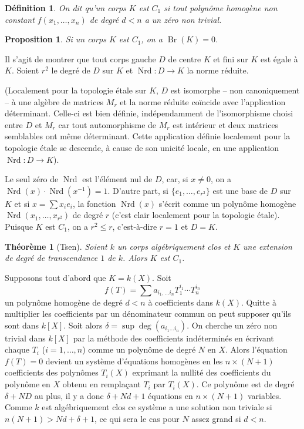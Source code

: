 \documentclass{book}
\DeclareMathOperator{\br}{Br}
\DeclareMathOperator{\nrd}{Nrd}
\newtheorem{proposition}[subsubsection]{Proposition}
\newtheorem{definition}[subsubsection]{Définition}
\newtheorem{theorem}[subsubsection]{Théorème}
\begin{document}
\begin{definition}\label{I:3-2-1}
On dit qu'un corps $K$ est $C_1$ si tout polynôme homogène non constant 
$f(x_1,\dotsc,x_n)$ de degré $d<n$ a un zéro non trivial.
\end{definition}





\begin{proposition}\label{I:3-2-2}
Si un corps $K$ est $C_1$, on a $\br(K)=0$.
\end{proposition}

Il s'agit de montrer que tout corps gauche $D$ de centre $K$ et fini sur $K$ 
est égale à $K$. Soient $r^2$ le degré de $D$ sur $K$ et $\nrd:D\to K$ la 
norme réduite. 

(Localement pour la topologie étale sur $K$, $D$ est isomorphe -- non 
canoniquement -- à une algèbre de matrices $M_r$ et la norme réduite 
coïncide avec l'application déterminant. Celle-ci est bien définie, 
indépendamment de l'isomorphisme choisi entre $D$ et $M_r$ car tout 
automorphisme de $M_r$ est intérieur et deux matrices semblables ont 
même déterminant. Cette application définie localement pour la 
topologie étale se descende, à cause de son unicité locale, en une 
application $\nrd:D\to K$). 

Le seul zéro de $\nrd$ est l'élément nul de $D$, car, si $x\ne 0$, on a 
$\nrd(x)\cdot \nrd(x^{-1}) = 1$. D'autre part, si $\{e_1,\dotsc,e_{r^2}\}$ est 
une base de $D$ sur $K$ et si $x=\sum x_i e_i$, la fonction $\nrd(x)$ s'écrit 
comme un polynôme homogène $\nrd(x_1,\dotsc,x_{r^2})$ de degré $r$ (c'est 
clair localement pour la topologie étale). Puisque $K$ est $C_1$, on a 
$r^2\leqslant r$, c'est-à-dire $r=1$ et $D=K$. 





\begin{theorem}[Tsen]\label{I:3-2-3}
Soient $k$ un corps algébriquement clos et $K$ une extension de degré de 
transcendance $1$ de $k$. Alors $K$ est $C_1$.
\end{theorem}

Supposons tout d'abord que $K=k(X)$. Soit 
\[
  f(T) = \sum a_{i_1,\dotsc i_n} T_1^{i_1} \dotsm T_n^{i_n}
\]
un polynôme homogène de degré $d<n$ à coefficients dans $k(X)$. Quitte 
à multiplier les coefficients par un dénominateur commun on peut supposer 
qu'ils sont dans $k[X]$. Soit alors $\delta=\sup\deg(a_{i_1\dotsc i_n})$. On 
cherche un zéro non trivial dans $k[X]$ par la méthode des coefficients 
indéterminés en écrivant chaque $T_i$ ($i=1,\dotsc,n$) comme un 
polynôme de degré $N$ en $X$. Alors l'équation $f(T)=0$ devient un système 
d'équations homogènes en les $n\times (N+1)$ coefficients des polynômes 
$T_i(X)$ exprimant la nullité des coefficients du polynôme en $X$ obtenu en 
remplaçant $T_i$ par $T_i(X)$. Ce polynôme est de degré $\delta+N D$ au plus, 
il y a donc $\delta+N d+1$ équations en $n\times (N+1)$ variables. Comme $k$ 
est algébriquement clos ce système a une solution non triviale si 
$n(N+1)>N d+\delta+1$, ce qui sera le cas pour $N$ assez grand si $d<n$. 
\end{document}

